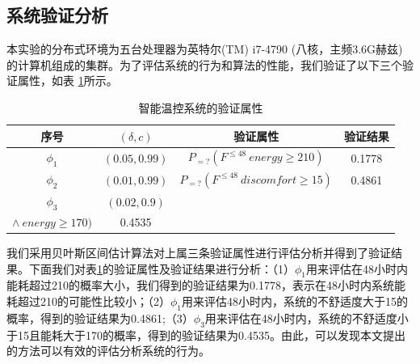 \subsection{系统验证分析}
本实验的分布式环境为五台处理器为英特尔(TM) i7-4790 (八核，主频3.6G赫兹)的计算机组成的集群。为了评估系统的行为和算法的性能，我们验证了以下三个验证属性，如表 \ref{tb:property}所示。
\begin{table}[t]
	\caption{智能温控系统的验证属性}
	\label{tb:property}
	\centering
	\begin{tabular}{c c c c}
		\hline
		序号 &  $(\delta,c)$ & 验证属性 & 验证结果 \\
		\hline
		$\phi_1$ & $(0.05,0.99)$  & $P_{=?}(F^{\leq48}~energy \geq 210)$ & 0.1778 \\ 
		$\phi_2$ & $(0.01,0.99)$  & $P_{=?}(F^{\leq48}~discomfort \geq 15)$ & 0.4861\\
		$\phi_3$ & $(0.02,0.9)$ & 
		\tabincell{c}{$P_{=?}(F^{\leq48}~ discomfort \leq 15$ \\ $\wedge~energy \geq 170)$} & 0.4535 \\
		\hline
	\end{tabular}
\end{table}
我们采用贝叶斯区间估计算法对上属三条验证属性进行评估分析并得到了验证结果。下面我们对表\ref{tb:property}的验证属性及验证结果进行分析：（1）$\phi_1$用来评估在48小时内能耗超过210的概率大小，我们得到的验证结果为0.1778，表示在48小时内系统能耗超过210的可能性比较小；（2）$\phi_1$用来评估48小时内，系统的不舒适度大于15的概率，得到的验证结果为0.4861;（3）$\phi_3$用来评估在48小时内，系统的不舒适度小于15且能耗大于170的概率，得到的验证结果为0.4535。由此，可以发现本文提出的方法可以有效的评估分析系统的行为。

